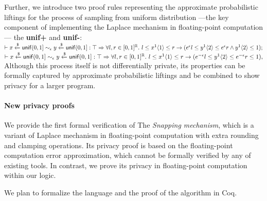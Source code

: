 \documentclass[a4paper,11pt]{article}
\begin{document}
Further, we introduce two proof rules representing the approximate probabilistic liftings for the process of sampling from uniform distribution 
---the key component of implementing the Laplace mechanism in floating-point computation---
the \textbf{unif+} and \textbf{unif-}:
\\
$\vdash
	x \xleftarrow{\$} \mathsf{unif}(0, 1] 	
	\sim_{\epsilon} 
	y \xleftarrow{\$} \mathsf{unif}(0, 1]
	:
	\top
	\Rightarrow
	\forall l, r \in [0,1]^{\mathbb{R}}. ~
	l \leq x^1 \langle 1 \rangle \leq r 
	\rightarrow
	(e^{\epsilon} l \leq y^1 \langle 2 \rangle \leq e^{\epsilon}r \land y^1 \langle 2 \rangle \leq 1);	
$
\\
$\vdash
	x \xleftarrow{\$} \mathsf{unif}(0, 1] 	
	\sim_{\epsilon} 
	y \xleftarrow{\$} \mathsf{unif}(0, 1]
	:
	\top
	\Rightarrow
	\forall l, r \in [0,1]^{\mathbb{R}}. ~
	l \leq x^1 \langle 1 \rangle \leq r 
	\rightarrow
	(e^{-\epsilon} l \leq y^1 \langle 2 \rangle \leq e^{-\epsilon}r \leq 1),
$
\\
%
%
%
Although this process itself is not differentially private, its properties can be formally captured by approximate probabilistic liftings and be combined to show privacy for a larger program.
%
\paragraph{New privacy proofs}
We provide the first formal verification of The \emph{Snapping mechanism}, which is a variant of Laplace mechanism in floating-point computation with extra rounding and clamping operations. 
Its privacy proof is based on the floating-point computation error approximation, which cannot be formally verified by any of existing tools. 
In contrast, we prove its privacy in floating-point computation within our logic.

We plan to formalize the language and the proof of the algorithm in Coq.
\end{document}
